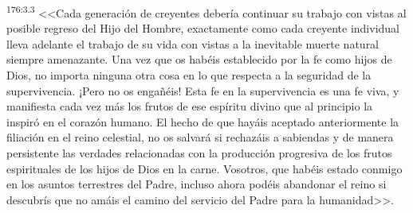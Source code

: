 \par 
\textsuperscript{176:3.3} <<Cada generación de creyentes debería continuar su trabajo con vistas al posible regreso del Hijo del Hombre, exactamente como cada creyente individual lleva adelante el trabajo de su vida con vistas a la inevitable muerte natural siempre amenazante. Una vez que os habéis establecido por la fe como hijos de Dios, no importa ninguna otra cosa en lo que respecta a la seguridad de la supervivencia. ¡Pero no os engañéis! Esta fe en la supervivencia es una fe viva, y manifiesta cada vez más los frutos de ese espíritu divino que al principio la inspiró en el corazón humano. El hecho de que hayáis aceptado anteriormente la filiación en el reino celestial, no os salvará si rechazáis a sabiendas y de manera persistente las verdades relacionadas con la producción progresiva de los frutos espirituales de los hijos de Dios en la carne. Vosotros, que habéis estado conmigo en los asuntos terrestres del Padre, incluso ahora podéis abandonar el reino si descubrís que no amáis el camino del servicio del Padre para la humanidad>>.

